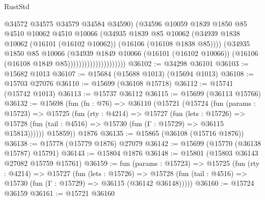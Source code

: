 \begin{lexlean}{RustStd}
\begin{coremodule}
                                      @34572
                                      @34575
                                      @34579
                                      @34584
                                      @34590)
                                    (@34596
                                      @10059
                                      @1839
                                      @1850
                                      @85
                                      @4510
                                      @10062
                                      @4510
                                      @10066
                                      (@34935
                                        @1839
                                        @85
                                        @10062
                                        (@34939
                                          @1838
                                          @10062
                                          (@16101 (@16102 @10062))
                                          (@16106 (@16108 @1838 @85))))
                                      (@34935
                                        @1850
                                        @85
                                        @10066
                                        (@34939
                                          @1849
                                          @10066
                                          (@16101 (@16102 @10066))
                                          (@16106 (@16108 @1849 @85)))))))))))))))))))))
@36102 := @34298 @36101
@36103 := @15682 @1013
@36107 := @15684 (@15688 @1013) (@15694 @1013)
@36108 := @15703 @27076
@36110 := @15699 (@36108 @15718)
@36112 := @15741 (@15742 @1013)
@36113 := @15737 @36112
@36115 := @15699 (@36113 @15766)
@36132 := @15698
    (fun (fn : @76) =>
    @36110
      (@15721
        (@15724
          (fun (params : @15723) =>
          @15725
            (fun (rty : @4214) =>
            @15727
              (fun (lets : @15726) =>
              @15728 (fun (tail : @4516) => @15730 (fun (Γ : @15729) => @36115 @15813))))))
        @15859))
    @1876
@36135 := @15865 (@36108 (@15716 @1876))
@36138 := @15778 (@15779 @1876) @27079
@36142 := @15699 (@15770 (@36138 @15787) @15791)
@36143 := @15804 @1876
@36148 := @15801 (@15803 @36143 @27082 @15759 @15761)
@36159 := fun (params : @15723) =>
  @15725
    (fun (rty : @4214) =>
    @15727
      (fun (lets : @15726) =>
      @15728 (fun (tail : @4516) => @15730 (fun (Γ : @15729) => @36115 (@36142 @36148)))))
@36160 := @15724 @36159
@36161 := @15721 @36160

\end{coremodule}
\end{lexlean}
